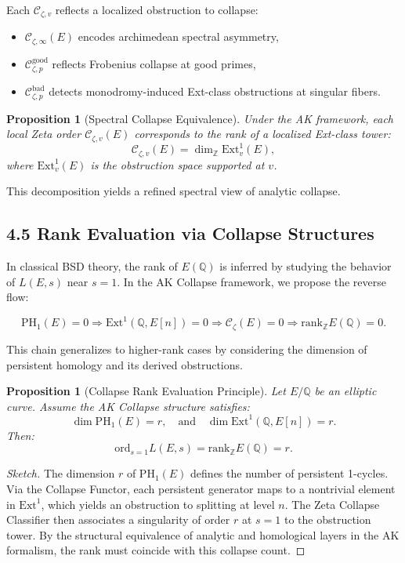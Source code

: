 \documentclass[11pt]{article}
\newtheorem{proposition}[theorem]{Proposition}
\begin{document}
\noindent
Each $\mathcal{C}_{\zeta,v}$ reflects a localized obstruction to collapse:
\begin{itemize}
  \item $\mathcal{C}_{\zeta,\infty}(E)$ encodes archimedean spectral asymmetry,
  \item $\mathcal{C}_{\zeta,p}^{\text{good}}$ reflects Frobenius collapse at good primes,
  \item $\mathcal{C}_{\zeta,p}^{\text{bad}}$ detects monodromy-induced Ext-class obstructions at singular fibers.
\end{itemize}

\begin{proposition}[Spectral Collapse Equivalence]
Under the AK framework, each local Zeta order $\mathcal{C}_{\zeta,v}(E)$ corresponds to the rank of a localized Ext-class tower:
\[
\mathcal{C}_{\zeta,v}(E) = \dim_{\mathbb{Z}} \mathrm{Ext}^1_v(E),
\]
where $\mathrm{Ext}^1_v(E)$ is the obstruction space supported at $v$.
\end{proposition}

This decomposition yields a refined spectral view of analytic collapse.

\subsection{4.5 Rank Evaluation via Collapse Structures}

In classical BSD theory, the rank of $E(\mathbb{Q})$ is inferred by studying the behavior of $L(E,s)$ near $s=1$.  
In the AK Collapse framework, we propose the reverse flow:

\[
\mathrm{PH}_1(E) = 0 \Rightarrow \mathrm{Ext}^1(\mathbb{Q},E[n]) = 0 \Rightarrow \mathcal{C}_{\zeta}(E) = 0 \Rightarrow \mathrm{rank}_{\mathbb{Z}} E(\mathbb{Q}) = 0.
\]

This chain generalizes to higher-rank cases by considering the dimension of persistent homology and its derived obstructions.

\begin{proposition}[Collapse Rank Evaluation Principle]
\label{prop:zeta-collapse-rank}
Let $E/\mathbb{Q}$ be an elliptic curve.  
Assume the AK Collapse structure satisfies:
\[
\dim \mathrm{PH}_1(E) = r,
\quad \text{and} \quad \dim \mathrm{Ext}^1(\mathbb{Q},E[n]) = r.
\]
Then:
\[
\mathrm{ord}_{s=1} L(E,s) = \mathrm{rank}_{\mathbb{Z}} E(\mathbb{Q}) = r.
\]
\end{proposition}

\begin{proof}[Sketch]
The dimension $r$ of $\mathrm{PH}_1(E)$ defines the number of persistent 1-cycles.  
Via the Collapse Functor, each persistent generator maps to a nontrivial element in $\mathrm{Ext}^1$, which yields an obstruction to splitting at level $n$.  
The Zeta Collapse Classifier then associates a singularity of order $r$ at $s = 1$ to the obstruction tower.  
By the structural equivalence of analytic and homological layers in the AK formalism, the rank must coincide with this collapse count.
\end{proof}
\end{document}
